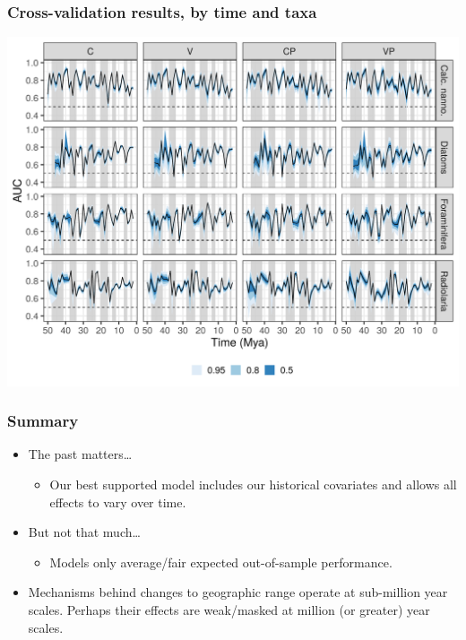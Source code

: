 \documentclass{beamer}
\begin{document}
\begin{frame}
  \frametitle{Cross-validation results, by time and taxa}

  \begin{center}
    \includegraphics[width=\textwidth,height=0.8\textheight,keepaspectratio=true]{../results/figure/fold_auc_taxon_time_full}
  \end{center}

\end{frame}


\begin{frame}
  \frametitle{Summary}

  \begin{itemize}
    \item \alert{The past matters\dots} 
      \begin{itemize}
        \item Our best supported model includes our historical covariates and allows all effects to vary over time.
      \end{itemize}
    \item \alert{But not that much\dots}
      \begin{itemize}
        \item Models only average/fair expected out-of-sample performance.
      \end{itemize}
    \item Mechanisms behind changes to geographic range operate at sub-million year scales. Perhaps their effects are weak/masked at million (or greater) year scales.
  \end{itemize}

\end{frame}
\end{document}
